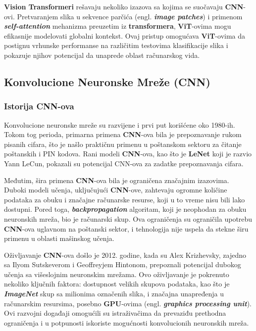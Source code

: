 \documentclass[12pt]{article}
\begin{document}
   \textbf{Vision Transformeri} rešavaju nekoliko izazova sa kojima se suočavaju \textbf{CNN}-ovi. 
   Pretvaranjem slika u sekvence parčića (engl. \textbf{\textit{image patches}}) i primenom \textbf{\textit{self-attention}} mehanizma preuzetim iz \textbf{transformera}, 
   \textbf{ViT}-ovima mogu efikasnije modelovati globalni kontekst. 
   Ovaj pristup omogućava \textbf{ViT}-ovima da postignu vrhunske performanse na različitim  
   testovima klasifikacije slika i pokazuje njihov potencijal da unaprede oblast računarskog vida.

   \subsection{Konvolucione Neuronske Mreže (\textbf{CNN})}
   \subsubsection{Istorija \textbf{CNN}-ova}
   Konvolucione neuronske mreže su razvijene 
   i prvi put korišćene oko 1980-ih. Tokom tog perioda, primarna primena 
   \textbf{CNN}-ova bila je prepoznavanje rukom pisanih cifara, što je našlo 
   praktičnu primenu u poštanskom sektoru za čitanje poštanskih i PIN kodova. 
   Rani modeli \textbf{CNN}-ova, kao što je \textbf{LeNet} \cite{lenet} koji je razvio Yann LeCun, pokazali su 
   potencijal CNN-ova za zadatke prepoznavanja cifara.

   Međutim, šira primena \textbf{CNN}-ova bila je ograničena značajnim izazovima. 
   Duboki modeli učenja, uključujući \textbf{CNN}-ove, zahtevaju ogromne količine 
   podataka za obuku i značajne računarske resurse, koji u to vreme nisu 
   bili lako dostupni. Pored toga, \textbf{\textit{backpropagation}} algoritam, 
   koji je neophodan za obuku neuronskih mreža, bio je računarski skup. 
   Ova ograničenja su ograničila upotrebu \textbf{CNN}-ova uglavnom na poštanski sektor, 
   i tehnologija nije uspela da stekne širu primenu u oblasti mašinskog učenja.

   Oživljavanje \textbf{CNN}-ova došlo je 2012. godine, kada su Alex Krizhevsky, zajedno 
   sa Ilyom Sutskeverom i Geoffreyjem Hintonom, prepoznali potencijal dubokog 
   učenja sa višeslojnim neuronskim mrežama. Ovo oživljavanje je pokrenuto nekoliko 
   ključnih faktora: dostupnost velikih skupova podataka, kao što je \textbf{\textit{ImageNet}} \cite{imagenet} skup sa 
   milionima označenih slika, i značajna unapređenja u računarskim resursima, posebno \textbf{GPU}-ovima 
   (engl. \textbf{\textit{graphics processing unit}}). Ovi razvojni događaji omogućili su istraživačima da prevaziđu prethodna ograničenja i u 
   potpunosti iskoriste mogućnosti konvolucionih neuronskih mreža.
\end{document}
